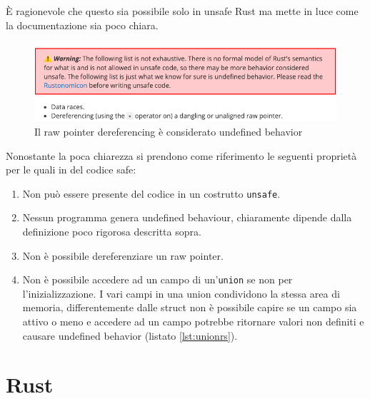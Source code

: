 \documentclass[Lau,binding=0.6cm]{sapthesis}
\newcommand{\textcode}[1]{\colorbox{backcolour}{\texttt{#1}}}
\begin{document}
È ragionevole che questo sia possibile solo in unsafe Rust ma mette in luce come la documentazione sia poco chiara. 




\begin{figure}[h!t]
    \centering
    \includegraphics[scale=0.52]{images/warning_undefined_behavior.png}
    \caption{Il raw pointer dereferencing è considerato undefined behavior}
    \label{fig:warning}
\end{figure}

Nonostante la poca chiarezza si prendono come riferimento le seguenti proprietà ~\cite[14]{rust:language} per le quali in del codice safe:
\begin{enumerate}
	\item Non può essere presente del codice in un costrutto \textcode{unsafe}.
	\item Nessun programma genera undefined behaviour, chiaramente dipende dalla definizione poco rigorosa descritta sopra.
	\item Non è possibile dereferenziare un raw pointer.
	\item Non è possibile accedere ad un campo di un'\textcode{union} se non per l'inizializzazione. I vari campi in una union condividono la stessa area di memoria, differentemente dalle struct non è possibile capire se un campo sia attivo o meno e accedere ad un campo potrebbe ritornare valori non definiti e causare undefined behavior (listato \ref{lst:unionrs}).
\end{enumerate}





\chapter{Rust} \label{chap:Rust}
\end{document}
